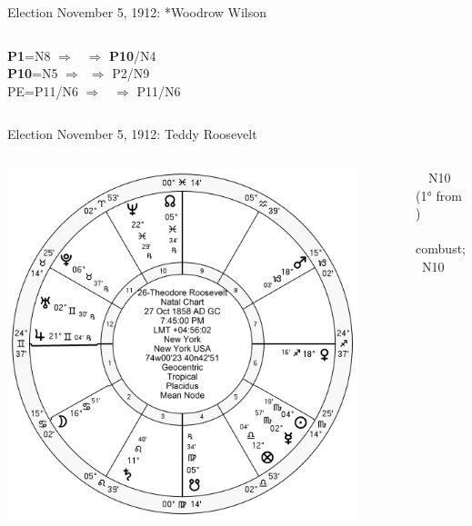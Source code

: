 \begin{frame}[t]{Election November 5, 1912: *Woodrow Wilson}
\begin{columns}[T, onlytextwidth]
\textbf{\dgreen P1}=N8
	$\Rightarrow$ \Venus\, $\Rightarrow$ \textbf{\red P10}/N4 \\
\textbf{\red P10}=N5
	$\Rightarrow$  \Saturn\,\Retrograde $\Rightarrow$ P2/N9 \\
PE=P11/N6
	$\Rightarrow$  \Jupiter\, $\Rightarrow$  P11/N6

\end{columns}
\end{frame}

\begin{frame}[t]{Election November 5, 1912: Teddy Roosevelt}
\small
\begin{columns}[T, onlytextwidth]
\vspace{-1em}
{\includegraphics[width=0.9\textwidth]{charts/Roosevelt.png}}
\fontsize{8pt}{9pt}\selectfont

\Jupiter\, \Square\, N10 (1° from \Neptune) \\
\Mercury\, combust; \Trine\, N10


\end{columns}
\end{frame}
